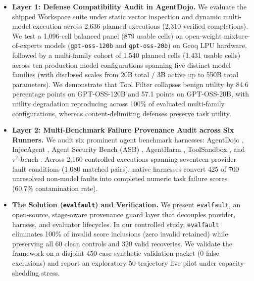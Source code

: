 \begin{itemize}
    \item \textbf{Layer 1: Defense Compatibility Audit in AgentDojo.} We evaluate the shipped Workspace suite under static vector inspection and dynamic multi-model execution across 2,636 planned executions (2,310 verified completions). We test a 1,096-cell balanced panel (879 usable cells) on open-weight mixture-of-experts models (\texttt{gpt-oss-120b} and \texttt{gpt-oss-20b}) on Groq LPU hardware, followed by a multi-family cohort of 1,540 planned cells (1,431 usable cells) across ten production model configurations spanning five distinct model families (with disclosed scales from 20B total / 3B active up to 550B total parameters). We demonstrate that Tool Filter collapses benign utility by 84.6 percentage points on GPT-OSS-120B and 57.1 points on GPT-OSS-20B, with utility degradation reproducing across 100\% of evaluated multi-family configurations, whereas content-delimiting defenses preserve task utility.
    \item \textbf{Layer 2: Multi-Benchmark Failure Provenance Audit across Six Runners.} We audit six prominent agent benchmark harnesses: AgentDojo \cite{debenedetti2024agentdojo}, InjecAgent \cite{zhan2024injecagent}, Agent Security Bench (ASB) \cite{zhang2025asb}, AgentHarm \cite{andriushchenko2025agentharm}, ToolSandbox \cite{lu2024toolsandbox}, and $\tau^2$-bench \cite{barres2025tau2}. Across 2,160 controlled executions spanning seventeen provider fault conditions (1,080 matched pairs), native harnesses convert 425 of 700 unresolved non-model faults into completed numeric task failure scores (60.7\% contamination rate).
    \item \textbf{The Solution (\texttt{evalfault}) and Verification.} We present \texttt{evalfault}, an open-source, stage-aware provenance guard layer that decouples provider, harness, and evaluator lifecycles. In our controlled study, \texttt{evalfault} eliminates 100\% of invalid score inclusions (zero invalid retained) while preserving all 60 clean controls and 320 valid recoveries. We validate the framework on a disjoint 450-case synthetic validation packet (0 false exclusions) and report an exploratory 50-trajectory live pilot under capacity-shedding stress.
\end{itemize}

